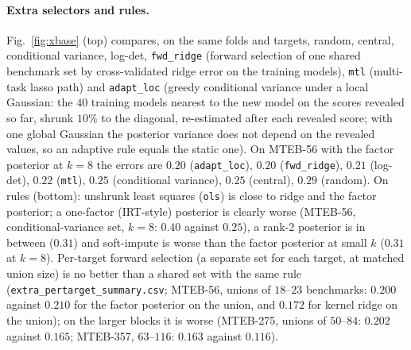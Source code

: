 \begin{table}[h]
\caption{$k^\star(G\ge0.8)$ by selector (kernel ridge and factor posterior). Random folds: CI rule with the bootstrap over models, organisations or strict families (1000 resamples), each with the $[2.5,97.5]\%$ range of the point $k^\star$ over the resamples. Right: the same criterion (bootstrap over models) under leave-organisation-out, strict-family leave-out and the temporal split (single fold, MTEB only). ``--'': selector not run on that split. Under shift the floor and the column mean are far higher (temporal MTEB-56: $1.4$--$1.5$ and $4.6$), so $G$ is relative to a poor floor.}
\label{tab:kstarsplit}
\centering\scriptsize\setlength{\tabcolsep}{3pt}

\end{table}
\paragraph{Extra selectors and rules.} Fig.~\ref{fig:xbase} (top) compares, on the same folds and targets, random, central, conditional variance, log-det, \texttt{fwd\_ridge} (forward selection of one shared benchmark set by cross-validated ridge error on the training models), \texttt{mtl} (multi-task lasso path) and \texttt{adapt\_loc} (greedy conditional variance under a local Gaussian: the $40$ training models nearest to the new model on the scores revealed so far, shrunk $10\%$ to the diagonal, re-estimated after each revealed score; with one global Gaussian the posterior variance does not depend on the revealed values, so an adaptive rule equals the static one). On MTEB-56 with the factor posterior at $k=8$ the errors are $0.20$ (\texttt{adapt\_loc}), $0.20$ (\texttt{fwd\_ridge}), $0.21$ (log-det), $0.22$ (\texttt{mtl}), $0.25$ (conditional variance), $0.25$ (central), $0.29$ (random). On rules (bottom): unshrunk least squares (\texttt{ols}) is close to ridge and the factor posterior; a one-factor (IRT-style) posterior is clearly worse (MTEB-56, conditional-variance set, $k=8$: $0.40$ against $0.25$), a rank-2 posterior is in between ($0.31$) and soft-impute is worse than the factor posterior at small $k$ ($0.31$ at $k=8$). Per-target forward selection (a separate set for each target, at matched union size) is no better than a shared set with the same rule (\texttt{extra\_pertarget\_summary.csv}; MTEB-56, unions of $18$--$23$ benchmarks: $0.200$ against $0.210$ for the factor posterior on the union, and $0.172$ for kernel ridge on the union); on the larger blocks it is worse (MTEB-275, unions of $50$--$84$: $0.202$ against $0.165$; MTEB-357, $63$--$116$: $0.163$ against $0.116$).

